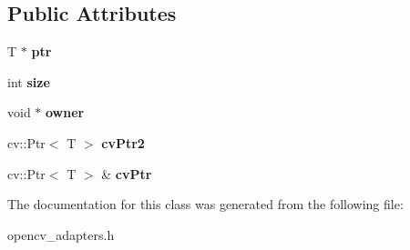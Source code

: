 \subsection*{Public Attributes}
\begin{DoxyCompactItemize}
\item 
\mbox{\label{class_ptr_adapter_a132d1522bcf885dfad9901551d8663f0}} 
T $\ast$ {\bfseries ptr}
\item 
\mbox{\label{class_ptr_adapter_a6c73564e8729f201404f2a2a1a5b5cbc}} 
int {\bfseries size}
\item 
\mbox{\label{class_ptr_adapter_a52caf0952aee1860d260029b09c3fa5f}} 
void $\ast$ {\bfseries owner}
\item 
\mbox{\label{class_ptr_adapter_a40d696a98c0ee842afaf686e79447333}} 
cv\+::\+Ptr$<$ T $>$ {\bfseries cv\+Ptr2}
\item 
\mbox{\label{class_ptr_adapter_a561b4b4598de9f1a9b2dbaa3045c3c32}} 
cv\+::\+Ptr$<$ T $>$ \& {\bfseries cv\+Ptr}
\end{DoxyCompactItemize}


The documentation for this class was generated from the following file\+:\begin{DoxyCompactItemize}
\item 
opencv\+\_\+adapters.\+h\end{DoxyCompactItemize}
